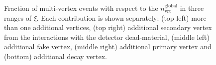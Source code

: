 \begin{figure}[h!]
\begin{subfigure}{.47\textwidth}
	\end{subfigure}
	\begin{minipage}{.47\textwidth}
			\caption{Fraction of multi-vertex events  with respect to the $n_\textrm{vrt}^\textrm{global}$ in three ranges of $\xi$. Each contribution is shown separately: (top left) more than one additional vertices, (top right) additional secondary vertex from the interactions with the detector dead-material, (middle left) additional fake vertex, (middle right) additional primary vertex and (bottom) additional decay vertex.}
			\label{fig:vertexVeto}
	\end{minipage}
\end{figure}


\FloatBarrier
